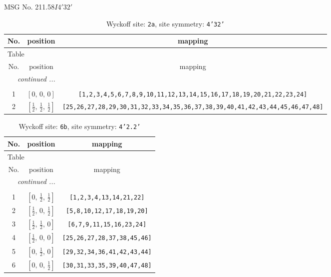 \documentclass[fleqn,8pt]{jsarticle}
\begin{document}
\setcounter{MaxMatrixCols}{32}

\renewcommand{\tablename}{Table~}
\renewcommand{\figurename}{Figure~}
\begin{center}
\LARGE
MSG No. 211.58\quad$I4'32'$
\end{center}
\renewcommand{\arraystretch}{1.2}
\begin{longtable}{ccc}
\caption{Wyckoff site: {\tt 2a}, site symmetry: {\tt 4'32'}}
 \\
 \hline \hline
No. & position & mapping \\ \hline \endfirsthead

\multicolumn{2}{l}{\tablename\ \thetable{}} \\
 \hline \hline
No. & position & mapping \\ \hline \endhead

 \hline \hline
\multicolumn{2}{r}{\footnotesize\it continued ...} \\ \endfoot

 \hline \hline
\multicolumn{2}{r}{} \\ \endlastfoot

1 & $\left[ 0,\, 0,\, 0 \right]$ & {\tt [1,2,3,4,5,6,7,8,9,10,11,12,13,14,15,16,17,18,19,20,21,22,23,24]} \\ \hline
2 & $\left[ \frac{1}{2},\, \frac{1}{2},\, \frac{1}{2} \right]$ & {\tt [25,26,27,28,29,30,31,32,33,34,35,36,37,38,39,40,41,42,43,44,45,46,47,48]} \\
\end{longtable}
\renewcommand{\arraystretch}{1.2}
\begin{longtable}{ccc}
\caption{Wyckoff site: {\tt 6b}, site symmetry: {\tt 4'2.2'}}
 \\
 \hline \hline
No. & position & mapping \\ \hline \endfirsthead

\multicolumn{2}{l}{\tablename\ \thetable{}} \\
 \hline \hline
No. & position & mapping \\ \hline \endhead

 \hline \hline
\multicolumn{2}{r}{\footnotesize\it continued ...} \\ \endfoot

 \hline \hline
\multicolumn{2}{r}{} \\ \endlastfoot

1 & $\left[ 0,\, \frac{1}{2},\, \frac{1}{2} \right]$ & {\tt [1,2,3,4,13,14,21,22]} \\ \hline
2 & $\left[ \frac{1}{2},\, 0,\, \frac{1}{2} \right]$ & {\tt [5,8,10,12,17,18,19,20]} \\ \hline
3 & $\left[ \frac{1}{2},\, \frac{1}{2},\, 0 \right]$ & {\tt [6,7,9,11,15,16,23,24]} \\ \hline
4 & $\left[ \frac{1}{2},\, 0,\, 0 \right]$ & {\tt [25,26,27,28,37,38,45,46]} \\ \hline
5 & $\left[ 0,\, \frac{1}{2},\, 0 \right]$ & {\tt [29,32,34,36,41,42,43,44]} \\ \hline
6 & $\left[ 0,\, 0,\, \frac{1}{2} \right]$ & {\tt [30,31,33,35,39,40,47,48]} \\
\end{longtable}
\end{document}
